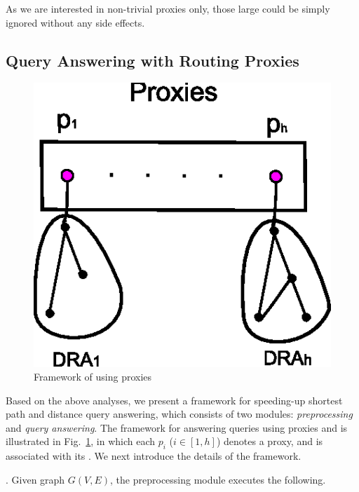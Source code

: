As we are interested in non-trivial proxies only, those large \bccs could be simply ignored without any side effects.



\subsection{Query Answering with Routing Proxies}
\label{subsec-proxy-query}


\begin{figure}[tb!]
\begin{center}
\includegraphics[scale=0.6]{./Proxy-framework.eps}
\end{center}
\vspace{-2ex}
\caption{Framework of using proxies}
\label{fig-angent-landmarks} \vspace{-2ex}
\end{figure}


 Based on the above analyses, we present a framework for speeding-up shortest  path and distance query answering, which consists of two modules: {\em preprocessing} and {\em query answering}. The framework for answering queries using proxies and \dras is illustrated in Fig.~\ref{fig-angent-landmarks}, in which each $p_i$ ($i\in[1, h]$) denotes a proxy, and is associated with its \dra. We next introduce the details of the framework.

. Given graph $G(V, E)$, the preprocessing module executes the following.

